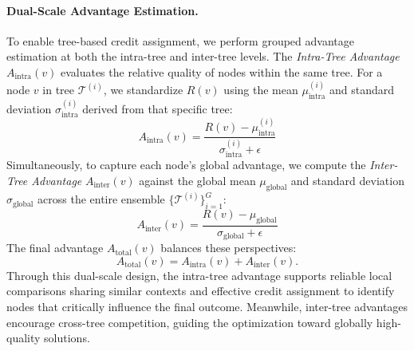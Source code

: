 \documentclass[11pt, a4paper]{lumia}
\begin{document}
\paragraph{Dual-Scale Advantage Estimation.}
To enable tree-based credit assignment, we perform grouped advantage estimation at both the intra-tree and inter-tree levels. The \textit{Intra-Tree Advantage} $A_{\text{intra}}(v)$ evaluates the relative quality of nodes within the same tree. For a node $v$ in tree $\mathcal{T}^{(i)}$, we standardize $R(v)$ using the mean $\mu_{\text{intra}}^{(i)}$ and standard deviation $\sigma_{\text{intra}}^{(i)}$ derived from that specific tree:
\begin{equation}
A_{\text{intra}}(v) = \frac{R(v) - \mu_{\text{intra}}^{(i)}}{\sigma_{\text{intra}}^{(i)} + \epsilon}
\end{equation}
Simultaneously, to capture each node’s global advantage, we compute the \textit{Inter-Tree Advantage} $A_{\text{inter}}(v)$ against the global mean $\mu_{\text{global}}$ and standard deviation $\sigma_{\text{global}}$ across the entire ensemble $\{ \mathcal{T}^{(i)} \}_{i=1}^G$:
\begin{equation}
A_{\text{inter}}(v) = \frac{R(v) - \mu_{\text{global}}}{\sigma_{\text{global}} + \epsilon}
\end{equation}
The final advantage $A_{\text{total}}(v)$ balances these perspectives:
\begin{equation}
A_{\text{total}}(v) = A_{\text{intra}}(v) + A_{\text{inter}}(v).
\end{equation}
Through this dual-scale design, the intra-tree advantage supports reliable local comparisons sharing similar contexts and effective credit assignment to identify nodes that critically influence the final outcome. Meanwhile, inter-tree advantages encourage cross-tree competition, guiding the optimization toward globally high-quality solutions.
\end{document}
